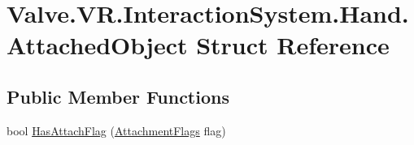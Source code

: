 \hypertarget{struct_valve_1_1_v_r_1_1_interaction_system_1_1_hand_1_1_attached_object}{}\section{Valve.\+V\+R.\+Interaction\+System.\+Hand.\+Attached\+Object Struct Reference}
\label{struct_valve_1_1_v_r_1_1_interaction_system_1_1_hand_1_1_attached_object}
\subsection*{Public Member Functions}
\begin{DoxyCompactItemize}
\item 
bool \mbox{\hyperlink{struct_valve_1_1_v_r_1_1_interaction_system_1_1_hand_1_1_attached_object_a67a2704780f26b5e61c638aedf8c3d41}{Has\+Attach\+Flag}} (\mbox{\hyperlink{class_valve_1_1_v_r_1_1_interaction_system_1_1_hand_a61701f82b8f3fac8818954ec71804cb5}{Attachment\+Flags}} flag)
\end{DoxyCompactItemize}
